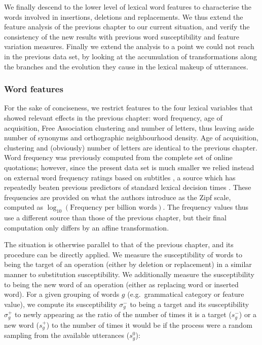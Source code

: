 We finally descend to the lower level of lexical word features to
characterise the words involved in insertions, deletions and
replacements. We thus extend the feature analysis of the previous
chapter to our current situation, and verify the consistency of the new
results with previous word susceptibility and feature variation
measures. Finally we extend the analysis to a point we could not reach
in the previous data set, by looking at the accumulation of
transformations along the branches and the evolution they cause in the
lexical makeup of utterances.

\subsubsection{Word features}\label{word-features}

For the sake of conciseness, we restrict features to the four lexical
variables that showed relevant effects in the previous chapter: word
frequency, age of acquisition, Free Association clustering and number of
letters, thus leaving aside number of synonyms and orthographic
neighbourhood density. Age of acquisition, clustering and (obviously)
number of letters are identical to the previous chapter. Word frequency
was previously computed from the complete set of online quotations;
however, since the present data set is much smaller we relied instead on
external word frequency ratings based on subtitles
\autocite{heuven_subtlex-uk:_2014}, a source which has repeatedly beaten
previous predictors of standard lexical decision times \autocite[see][
for more details]{heuven_subtlex-uk:_2014}. These frequencies are
provided on what the authors introduce as the Zipf scale, computed as
\(\log_{10}(\text{Frequency per billion words})\). The frequency values
thus use a different source than those of the previous chapter, but
their final computation only differs by an affine transformation.

The situation is otherwise parallel to that of the previous chapter, and
its procedure can be directly applied. We measure the susceptibility of
words to being the target of an operation (either by deletion or
replacement) in a similar manner to substitution susceptibility. We
additionally measure the susceptibility to being the new word of an
operation (either as replacing word or inserted word). For a given
grouping of words \(g\) (e.g.~grammatical category or feature value), we
compute its susceptibility \(\sigma_g^-\) to being a target and its
susceptibility \(\sigma_g^+\) to newly appearing as the ratio of the
number of times it is a target (\(s_g^-\)) or a new word (\(s_g^+\)) to
the number of times it would be if the process were a random sampling
from the available utterances (\(s_g^0\)):

